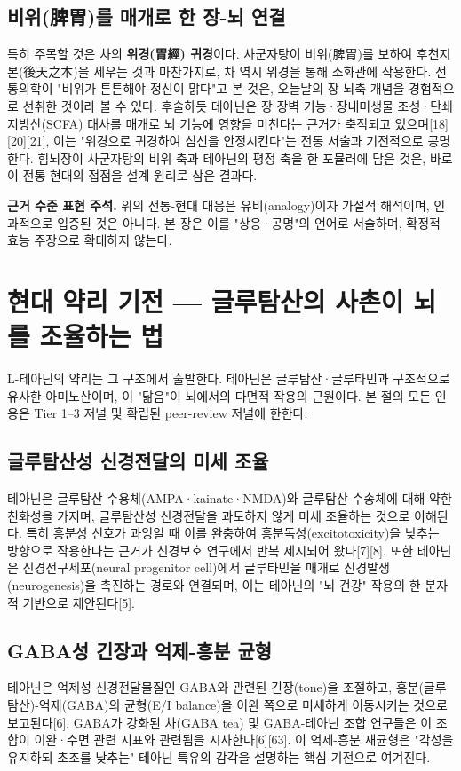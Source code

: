 \documentclass[11pt,oneside]{book}
\newenvironment{authnote}
  {\par\smallskip\begingroup\leftskip=7mm\rightskip=5mm\small\color{muted}\noindent\ignorespaces}
  {\par\endgroup\smallskip}
\begin{document}
\subsection{비위(脾胃)를 매개로 한 장-뇌 연결}
특히 주목할 것은 차의 \textbf{위경(胃經) 귀경}이다. 사군자탕이 비위(脾胃)를 보하여 후천지본(後天之本)을 세우는 것과 마찬가지로, 차 역시 위경을 통해 소화관에 작용한다. 전통의학이 "비위가 튼튼해야 정신이 맑다"고 본 것은, 오늘날의 장-뇌축 개념을 경험적으로 선취한 것이라 볼 수 있다. 후술하듯 테아닌은 장 장벽 기능·장내미생물 조성·단쇄지방산(SCFA) 대사를 매개로 뇌 기능에 영향을 미친다는 근거가 축적되고 있으며[18][20][21], 이는 "위경으로 귀경하여 심신을 안정시킨다"는 전통 서술과 기전적으로 공명한다. 힘뇌장이 사군자탕의 비위 축과 테아닌의 평정 축을 한 포뮬러에 담은 것은, 바로 이 전통-현대의 접점을 설계 원리로 삼은 결과다.

\begin{authnote}\textbf{근거 수준 표현 주석.} 위의 전통-현대 대응은 유비(analogy)이자 가설적 해석이며, 인과적으로 입증된 것은 아니다. 본 장은 이를 "상응·공명"의 언어로 서술하며, 확정적 효능 주장으로 확대하지 않는다.\end{authnote}
\section{현대 약리 기전 — 글루탐산의 사촌이 뇌를 조율하는 법}
L-테아닌의 약리는 그 구조에서 출발한다. 테아닌은 글루탐산·글루타민과 구조적으로 유사한 아미노산이며, 이 "닮음"이 뇌에서의 다면적 작용의 근원이다. 본 절의 모든 인용은 Tier 1–3 저널 및 확립된 peer-review 저널에 한한다.

\subsection{글루탐산성 신경전달의 미세 조율}
테아닌은 글루탐산 수용체(AMPA·kainate·NMDA)와 글루탐산 수송체에 대해 약한 친화성을 가지며, 글루탐산성 신경전달을 과도하지 않게 미세 조율하는 것으로 이해된다. 특히 흥분성 신호가 과잉일 때 이를 완충하여 흥분독성(excitotoxicity)을 낮추는 방향으로 작용한다는 근거가 신경보호 연구에서 반복 제시되어 왔다[7][8]. 또한 테아닌은 신경전구세포(neural progenitor cell)에서 글루타민을 매개로 신경발생(neurogenesis)을 촉진하는 경로와 연결되며, 이는 테아닌의 "뇌 건강" 작용의 한 분자적 기반으로 제안된다[5].

\subsection{GABA성 긴장과 억제-흥분 균형}
테아닌은 억제성 신경전달물질인 GABA와 관련된 긴장(tone)을 조절하고, 흥분(글루탐산)-억제(GABA)의 균형(E/I balance)을 이완 쪽으로 미세하게 이동시키는 것으로 보고된다[6]. GABA가 강화된 차(GABA tea) 및 GABA-테아닌 조합 연구들은 이 조합이 이완·수면 관련 지표와 관련됨을 시사한다[6][63]. 이 억제-흥분 재균형은 "각성을 유지하되 초조를 낮추는" 테아닌 특유의 감각을 설명하는 핵심 기전으로 여겨진다.
\end{document}
